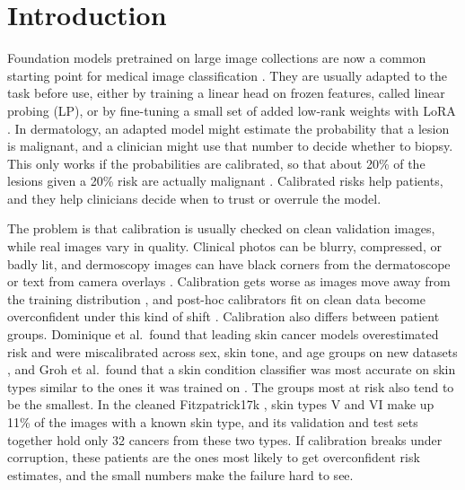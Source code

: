 \documentclass[sigconf,nonacm]{acmart}
\begin{document}


\maketitle

\section{Introduction}
\label{sec:intro}

Foundation models pretrained on large image collections are now a common starting point for medical image classification \cite{moor2023generalist,oquab2024dinov2,zhang2025biomedclip}. They are usually adapted to the task before use, either by training a linear head on frozen features, called linear probing (LP), or by fine-tuning a small set of added low-rank weights with LoRA \cite{hu2022lora,jin2024fairmedfm}. In dermatology, an adapted model might estimate the probability that a lesion is malignant, and a clinician might use that number to decide whether to biopsy. This only works if the probabilities are calibrated, so that about 20\% of the lesions given a 20\% risk are actually malignant \cite{guo2017calibration}. Calibrated risks help patients, and they help clinicians decide when to trust or overrule the model.

The problem is that calibration is usually checked on clean validation images, while real images vary in quality. Clinical photos can be blurry, compressed, or badly lit, and dermoscopy images can have black corners from the dermatoscope or text from camera overlays \cite{disalvo2024medmnistc}. Calibration gets worse as images move away from the training distribution \cite{ovadia2019trust}, and post-hoc calibrators fit on clean data become overconfident under this kind of shift \cite{tomani2021posthoc}. Calibration also differs between patient groups. Dominique et al.\ found that leading skin cancer models overestimated risk and were miscalibrated across sex, skin tone, and age groups on new datasets \cite{dominique2025calibration}, and Groh et al.\ found that a skin condition classifier was most accurate on skin types similar to the ones it was trained on \cite{groh2021fitzpatrick}. The groups most at risk also tend to be the smallest. In the cleaned Fitzpatrick17k \cite{abhishek2025quality}, skin types V and VI make up 11\% of the images with a known skin type, and its validation and test sets together hold only 32 cancers from these two types. If calibration breaks under corruption, these patients are the ones most likely to get overconfident risk estimates, and the small numbers make the failure hard to see.
\end{document}
